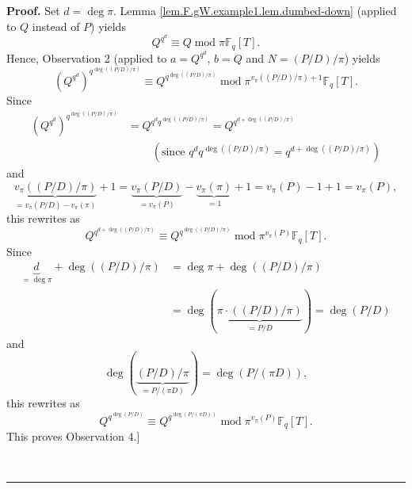 \documentclass[numbers=enddot,12pt,final,onecolumn,notitlepage]{scrartcl}%
\theoremstyle{definition}
\newenvironment{proof}[1][Proof]{\noindent\textbf{#1.} }{\ \rule{0.5em}{0.5em}}
\begin{document}
\begin{proof}
Set $d=\deg\pi$. Lemma \ref{lem.F.gW.example1.lem.dumbed-down} (applied to $Q$
instead of $P$) yields%
\[
Q^{q^{d}}\equiv Q\operatorname{mod}\pi\mathbb{F}_{q}\left[  T\right]  .
\]
Hence, Observation 2 (applied to $a=Q^{q^{d}}$, $b=Q$ and $N=\left(
P/D\right)  /\pi$) yields
\[
\left(  Q^{q^{d}}\right)  ^{q^{\deg\left(  \left(  P/D\right)  /\pi\right)  }%
}\equiv Q^{q^{\deg\left(  \left(  P/D\right)  /\pi\right)  }}%
\operatorname{mod}\pi^{v_{\pi}\left(  \left(  P/D\right)  /\pi\right)
+1}\mathbb{F}_{q}\left[  T\right]  .
\]
Since%
\begin{align*}
\left(  Q^{q^{d}}\right)  ^{q^{\deg\left(  \left(  P/D\right)  /\pi\right)
}}  &  =Q^{q^{d}q^{\deg\left(  \left(  P/D\right)  /\pi\right)  }%
}=Q^{q^{d+\deg\left(  \left(  P/D\right)  /\pi\right)  }}\\
&  \ \ \ \ \ \ \ \ \ \ \left(  \text{since }q^{d}q^{\deg\left(  \left(
P/D\right)  /\pi\right)  }=q^{d+\deg\left(  \left(  P/D\right)  /\pi\right)
}\right)
\end{align*}
and%
\[
\underbrace{v_{\pi}\left(  \left(  P/D\right)  /\pi\right)  }_{=v_{\pi}\left(
P/D\right)  -v_{\pi}\left(  \pi\right)  }+1=\underbrace{v_{\pi}\left(
P/D\right)  }_{=v_{\pi}\left(  P\right)  }-\underbrace{v_{\pi}\left(
\pi\right)  }_{=1}+1=v_{\pi}\left(  P\right)  -1+1=v_{\pi}\left(  P\right)  ,
\]
this rewrites as%
\[
Q^{q^{d+\deg\left(  \left(  P/D\right)  /\pi\right)  }}\equiv Q^{q^{\deg
\left(  \left(  P/D\right)  /\pi\right)  }}\operatorname{mod}\pi^{v_{\pi
}\left(  P\right)  }\mathbb{F}_{q}\left[  T\right]  .
\]
Since%
\begin{align*}
\underbrace{d}_{=\deg\pi}+\deg\left(  \left(  P/D\right)  /\pi\right)   &
=\deg\pi+\deg\left(  \left(  P/D\right)  /\pi\right) \\
&  =\deg\left(  \underbrace{\pi\cdot\left(  \left(  P/D\right)  /\pi\right)
}_{=P/D}\right)  =\deg\left(  P/D\right)
\end{align*}
and%
\[
\deg\left(  \underbrace{\left(  P/D\right)  /\pi}_{=P/\left(  \pi D\right)
}\right)  =\deg\left(  P/\left(  \pi D\right)  \right)  ,
\]
this rewrites as
\[
Q^{q^{\deg\left(  P/D\right)  }}\equiv Q^{q^{\deg\left(  P/\left(  \pi
D\right)  \right)  }}\operatorname{mod}\pi^{v_{\pi}\left(  P\right)
}\mathbb{F}_{q}\left[  T\right]  .
\]
This proves Observation 4.]


\end{proof}
\end{document}
